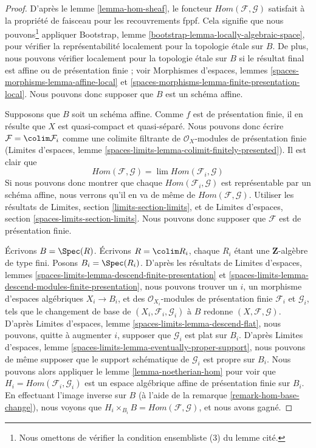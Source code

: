 \begin{proof}
D'après le lemme \ref{lemma-hom-sheaf}, le foncteur
$\mathit{Hom}(\mathcal{F}, \mathcal{G})$ satisfait à la propriété de faisceau
pour les recouvrements fppf. Cela signifie que nous pouvons\footnote{Nous
omettons de vérifier la condition ensembliste (3) du lemme cité.} appliquer
Bootstrap, lemme \ref{bootstrap-lemma-locally-algebraic-space}, pour vérifier
la représentabilité localement pour la topologie étale sur $B$. De plus, nous
pouvons vérifier localement pour la topologie étale sur $B$ si le résultat
final est affine ou de présentation finie ; voir Morphismes d'espaces, lemmes
\ref{spaces-morphisms-lemma-affine-local} et
\ref{spaces-morphisms-lemma-finite-presentation-local}. Nous pouvons donc
supposer que $B$ est un schéma affine.

\medskip\noindent
Supposons que $B$ soit un schéma affine. Comme $f$ est de présentation finie,
il en résulte que $X$ est quasi-compact et quasi-séparé. Nous pouvons donc
écrire $\mathcal{F} = \colim \mathcal{F}_i$ comme une colimite filtrante de
$\mathcal{O}_X$-modules de présentation finie (Limites d'espaces, lemme
\ref{spaces-limits-lemma-colimit-finitely-presented}). Il est clair que
$$
\mathit{Hom}(\mathcal{F}, \mathcal{G}) =
\lim \mathit{Hom}(\mathcal{F}_i, \mathcal{G})
$$
Si nous pouvons donc montrer que chaque
$\mathit{Hom}(\mathcal{F}_i, \mathcal{G})$ est représentable par un schéma
affine, nous verrons qu'il en va de même de
$\mathit{Hom}(\mathcal{F}, \mathcal{G})$. Utiliser les résultats de Limites,
section \ref{limits-section-limits}, et de Limites d'espaces, section
\ref{spaces-limits-section-limits}. Nous pouvons donc supposer que
$\mathcal{F}$ est de présentation finie.

\medskip\noindent
Écrivons $B = \Spec(R)$. Écrivons $R = \colim R_i$, chaque $R_i$ étant une
$\mathbf{Z}$-algèbre de type fini. Posons $B_i = \Spec(R_i)$. D'après les
résultats de Limites d'espaces, lemmes
\ref{spaces-limits-lemma-descend-finite-presentation} et
\ref{spaces-limits-lemma-descend-modules-finite-presentation}, nous pouvons
trouver un $i$, un morphisme d'espaces algébriques $X_i \to B_i$, et des
$\mathcal{O}_{X_i}$-modules de présentation finie $\mathcal{F}_i$ et
$\mathcal{G}_i$, tels que le changement de base de
$(X_i, \mathcal{F}_i, \mathcal{G}_i)$ à $B$ redonne
$(X, \mathcal{F}, \mathcal{G})$. D'après Limites d'espaces, lemme
\ref{spaces-limits-lemma-descend-flat}, nous pouvons, quitte à augmenter $i$,
supposer que $\mathcal{G}_i$ est plat sur $B_i$. D'après Limites d'espaces,
lemme \ref{spaces-limits-lemma-eventually-proper-support}, nous pouvons de
même supposer que le support schématique de $\mathcal{G}_i$ est propre sur
$B_i$. Nous pouvons alors appliquer le lemme \ref{lemma-noetherian-hom} pour
voir que $H_i = \mathit{Hom}(\mathcal{F}_i, \mathcal{G}_i)$ est un espace
algébrique affine de présentation finie sur $B_i$. En effectuant l'image
inverse sur $B$ (à l'aide de la remarque \ref{remark-hom-base-change}), nous
voyons que $H_i \times_{B_i} B = \mathit{Hom}(\mathcal{F}, \mathcal{G})$,
et nous avons gagné.
\end{proof}

